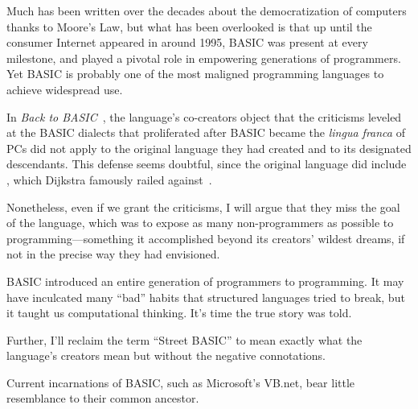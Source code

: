 



Much has been written over the decades about the democratization of
computers thanks to Moore's Law, but what has been overlooked is that up
until the consumer Internet appeared in around 1995, BASIC was present
at every milestone, and played a pivotal role in empowering generations
of programmers.
Yet BASIC is probably one of the most maligned programming languages
to achieve widespread use.

In \emph{Back to BASIC}~\cite{backtobasic}, the language's co-creators
object that the criticisms leveled at the 
BASIC dialects that proliferated after BASIC became the
\emph{lingua franca} of PCs did not apply to the original language
they had created and to its designated descendants.
This defense seems doubtful, since the original language did include
, which Dijkstra famously railed
against~\cite{goto_considered_harmful}.

Nonetheless, even if we grant the criticisms,
I will argue that they miss the goal of the
language, which was to expose as many non-programmers as possible to
programming---something it accomplished beyond its creators' wildest dreams,
if not in the precise way they had envisioned.

BASIC introduced an entire generation of
programmers to programming.  It may have inculcated many ``bad'' habits that
structured languages tried to break, but it taught us computational
thinking.    It's time the true story was told.

Further, I'll reclaim the term ``Street
BASIC'' to mean exactly what the language's creators mean but without
the negative connotations.

Current incarnations of BASIC, such as Microsoft's VB.net, bear little resemblance to
their common ancestor.

